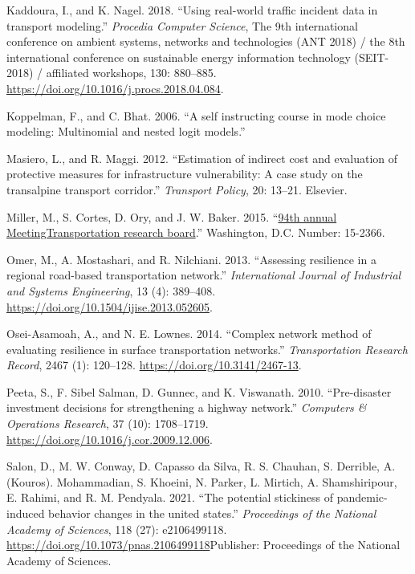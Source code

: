 \documentclass[]{ascelike-new}
\newlength{\cslhangindent}
\newenvironment{CSLReferences}[2] %
 {\begin{list}{}{%
  \setlength{\itemindent}{0pt}
  \setlength{\leftmargin}{0pt}
  \setlength{\parsep}{0pt}
  \ifodd #1
   \setlength{\leftmargin}{\cslhangindent}
   \setlength{\itemindent}{-1\cslhangindent}
  \fi
  \setlength{\itemsep}{#2\baselineskip}}}
 {\end{list}}
\begin{document}
\begin{CSLReferences}{1}{0}
Kaddoura, I., and K. Nagel. 2018. {``Using real-world traffic incident
data in transport modeling.''} \emph{Procedia Computer Science}, The 9th
international conference on ambient systems, networks and technologies
({ANT} 2018) / the 8th international conference on sustainable energy
information technology ({SEIT-2018}) / affiliated workshops, 130:
880--885. \url{https://doi.org/10.1016/j.procs.2018.04.084}.

Koppelman, F., and C. Bhat. 2006. {``A self instructing course in mode
choice modeling: Multinomial and nested logit models.''}

Masiero, L., and R. Maggi. 2012. {``Estimation of indirect cost and
evaluation of protective measures for infrastructure vulnerability: A
case study on the transalpine transport corridor.''} \emph{Transport
Policy}, 20: 13--21. Elsevier.

Miller, M., S. Cortes, D. Ory, and J. W. Baker. 2015.
{``\href{https://trid.trb.org/View/1337593}{94th annual
MeetingTransportation research board}.''} Washington, D.C. Number:
15-2366.

Omer, M., A. Mostashari, and R. Nilchiani. 2013. {``Assessing resilience
in a regional road-based transportation network.''} \emph{International
Journal of Industrial and Systems Engineering}, 13 (4): 389--408.
\url{https://doi.org/10.1504/ijise.2013.052605}.

Osei-Asamoah, A., and N. E. Lownes. 2014. {``Complex network method of
evaluating resilience in surface transportation networks.''}
\emph{Transportation Research Record}, 2467 (1): 120--128.
\url{https://doi.org/10.3141/2467-13}.

Peeta, S., F. Sibel Salman, D. Gunnec, and K. Viswanath. 2010.
{``Pre-disaster investment decisions for strengthening a highway
network.''} \emph{Computers \& Operations Research}, 37 (10):
1708--1719. \url{https://doi.org/10.1016/j.cor.2009.12.006}.

Salon, D., M. W. Conway, D. Capasso da Silva, R. S. Chauhan, S.
Derrible, A. (Kouros). Mohammadian, S. Khoeini, N. Parker, L. Mirtich,
A. Shamshiripour, E. Rahimi, and R. M. Pendyala. 2021. {``The potential
stickiness of pandemic-induced behavior changes in the united states.''}
\emph{Proceedings of the National Academy of Sciences}, 118 (27):
e2106499118. \url{https://doi.org/10.1073/pnas.2106499118}Publisher:
Proceedings of the National Academy of Sciences.


\end{CSLReferences}
\end{document}
